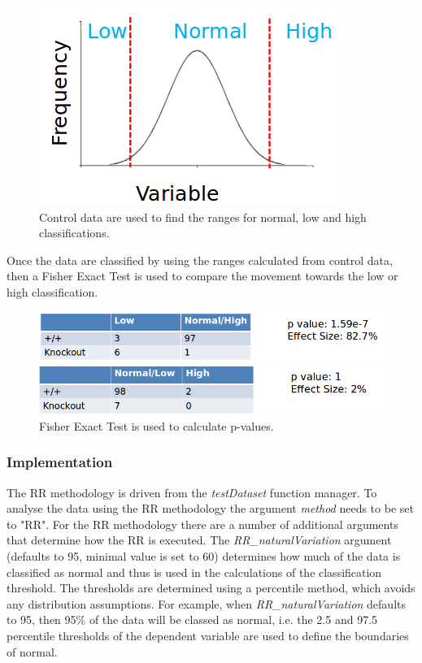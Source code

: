 \documentclass[12pt,a4paper]{article}
\begin{document}
\begin{figure}[H]%
\centerline{\includegraphics[scale=0.4]{RR1_simple.png}}
\caption{Control data are used to find the ranges for normal, low and high classifications.}
\end{figure} 

Once the data are classified by using the ranges calculated from control data, then a Fisher Exact Test is used to compare the movement towards the low or high classification. 

\begin{figure}[H]%
\centerline{\includegraphics[scale=0.4]{RR2_1_simple.png}}
\centerline{\includegraphics[scale=0.4]{RR2_2_simple.png}}
\caption{Fisher Exact Test is used to calculate p-values.}
\end{figure} 

\subsubsection{Implementation}
The RR methodology is driven from the \textit{testDataset} function manager. To analyse the data using the RR methodology the argument \textit{method} needs to be set to "RR".  For the RR methodology there are a number of additional arguments that determine how the RR is executed. The \textit{RR\_naturalVariation} argument (defaults to 95, minimal value is set to 60) determines how much of the data is classified as normal and thus is used in the calculations of the classification threshold. The thresholds are determined using a percentile method, which avoids any distribution assumptions. 
For example, when \textit{RR\_naturalVariation} defaults to 95, then 95\%  of the data will be classed as normal, i.e. the 2.5 and 97.5 percentile thresholds of the dependent variable are used to define the boundaries of normal. 
\end{document}
